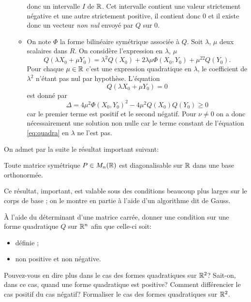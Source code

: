 \documentclass[11pt, a4paper]{article}
\begin{document}
\begin{solution}
\begin{itemize}
\begin{itemize}
      donc un intervalle $I$ de $\mathbb{R}$. Cet intervalle contient une
      valeur strictement négative et une autre strictement positive,
      il contient donc $0$ et il existe donc un vecteur \emph{non nul}
      envoyé par $Q$ sur $0$.
    \item On note $\Phi$ la forme bilinéaire symétrique associée à
      $Q$. Soit $\lambda$, $\mu$ deux scalaires dans $R$. On considère
      l'expression en $\lambda$, $\mu$
      \[
      Q(\lambda X_0 + \mu Y_0) = \lambda^2Q(X_0) +
      2\lambda\mu\Phi(X_0, Y_0) + \mu^22Q(Y_0).
      \]
      Pour chaque $\mu \in \mathbb{R}$ c'est une expression quadratique en
      $\lambda$, le coefficient de $\lambda^2$ n'étant pas nul par
      hypothèse. L'équation
      \begin{equation}
        \label{eq:quadra}
        Q(\lambda X_0 + \mu Y_0) = 0
      \end{equation}
      est donné par
      \[
      \Delta = 4\mu^2\Phi(X_0, Y_0)^2 - 4\mu^2Q(X_0)Q(Y_0) \geq 0
      \]
      car le premier terme est positif et le second négatif. Pour
      $\nu \neq 0$ on a donc nécessairement une solution non nulle car
      le terme constant de l'équation \eqref{eq:quadra} en $\lambda$
      ne l'est pas.
    \end{itemize}
  \end{itemize}
\end{solution}
On admet par la suite le résultat important suivant:
\begin{thm}
  \label{thm:reducsym}
  Toute matrice symétrique $P \in M_n(\mathbb{R})$ est diagonalisable sur
  $\mathbb{R}$ dans une base orthonormée.
\end{thm}
\noindent Ce résultat, important, est valable sous des conditions beaucoup plus
larges sur le corps de base ; on le  montre en partie à l'aide d'un
algorithme dit de Gauss.
\begin{question}
  \label{qu:critereposdefn}
  À l'aide du déterminant d'une matrice carrée, donner une condition
  sur une forme quadratique $Q$ sur $\mathbb{R}^n$ afin que celle-ci soit:
  \begin{itemize}
  \item
    définie ;
  \item
    non positive et non négative.
  \end{itemize}
  Pouvez-vous en dire plus dans le cas des formes quadratiques sur
  $\mathbb{R}^2$? Sait-on, dans ce cas, quand une forme quadratique est
  positive? Comment différencier le cas positif du cas négatif?
  Formaliser le cas des formes quadratiques sur $\mathbb{R}^2$.
\end{question}
\end{document}
